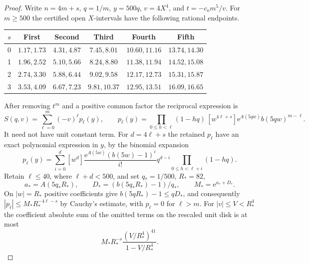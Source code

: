\documentclass[11pt]{article}
\newcommand{\ee}{\mathrm e}
\begin{document}
\begin{proof}
Write \(n=4m+s\), \(q=1/m\), \(y=500q\), \(v=4X^4\), and \(t=-c_{\mathrm o}m^5/v\). For \(m\ge500\) the certified open \(X\)-intervals have the following rational endpoints.
\begin{center}
\small
\begin{tabular}{c@{\quad}ccccc}
\toprule
\(s\) & First & Second & Third & Fourth & Fifth\\
\midrule
0 & \(1.17,1.73\) & \(4.31,4.87\) & \(7.45,8.01\) & \(10.60,11.16\) & \(13.74,14.30\)\\
1 & \(1.96,2.52\) & \(5.10,5.66\) & \(8.24,8.80\) & \(11.38,11.94\) & \(14.52,15.08\)\\
2 & \(2.74,3.30\) & \(5.88,6.44\) & \(9.02,9.58\) & \(12.17,12.73\) & \(15.31,15.87\)\\
3 & \(3.53,4.09\) & \(6.67,7.23\) & \(9.81,10.37\) & \(12.95,13.51\) & \(16.09,16.65\)\\
\bottomrule
\end{tabular}
\end{center}
After removing \(t^m\) and a positive common factor the reciprocal expression is
\[
 S(q,v)=\sum_{\ell=0}^m(-v)^\ell p_\ell(y),\qquad
 p_\ell(y)=\prod_{0\le h<\ell}(1-hq)\,[w^{4\ell+s}]
                 \ee^{A(5qw)} b(5qw)^{m-\ell}.
\]
It need not have unit constant term. For \(d=4\ell+s\) the retained \(p_\ell\) have an exact polynomial expression in \(y\), by the binomial expansion
\begin{equation}\label{eq:effcoef}
 p_\ell(y)=\sum_{i=0}^d [w^d]\frac{\ee^{A(5w)}(b(5w)-1)^i}{i!}
             q^{d-i}\prod_{0\le h<\ell+i}(1-hq).
\end{equation}
Retain \(\ell\le40\), where \(\ell+d<500\), and set \(q_*=1/500\), \(R_*=82\),
\[
 a_*=A(5q_*R_*),\qquad D_*=(b(5q_*R_*)-1)/q_*,\qquad M_*=\ee^{a_*+D_*}.
\]
On \(|w|=R_*\) positive coefficients give \(b(5qR_*)-1\le qD_*\), and consequently \(|p_\ell|\le M_*R_*^{-4\ell-s}\) by Cauchy's estimate, with \(p_\ell=0\) for \(\ell>m\). For \(|v|\le V<R_*^4\) the coefficient absolute sum of the omitted terms on the rescaled unit disk is at most
\[
 M_*R_*^{-s}\frac{(V/R_*^4)^{41}}{1-V/R_*^4}.
\]


\end{proof}
\end{document}
